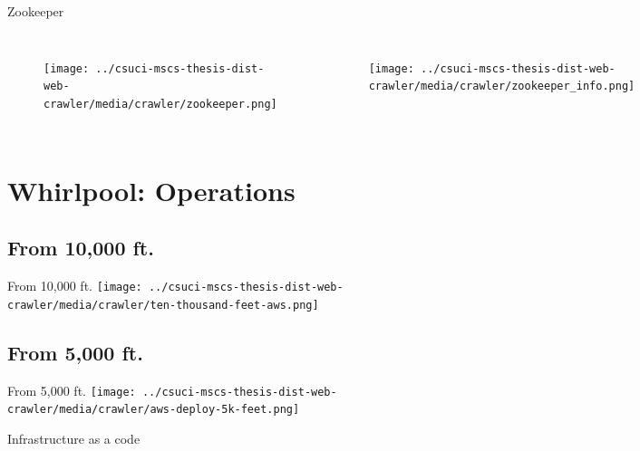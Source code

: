 \documentclass[9pt]{beamer}
\begin{document}

\begin{frame}{Zookeeper}
  \begin{columns}[t]
    \begin{figure}
     \centering \texttt{[image: ../csuci-mscs-thesis-dist-web-crawler/media/crawler/zookeeper.png]}
   \end{figure}
   \begin{figure}
     \centering
     \texttt{[image: ../csuci-mscs-thesis-dist-web-crawler/media/crawler/zookeeper\_info.png]}
   \end{figure}
 \end{columns}
\end{frame}


\section[opswork]{Whirlpool: Operations}
\begin{frame}[plain]
\end{frame}


\subsection{From 10,000 ft.}
\begin{frame}{From 10,000 ft.}
 \centering
 \texttt{[image: ../csuci-mscs-thesis-dist-web-crawler/media/crawler/ten-thousand-feet-aws.png]} 
\end{frame}


\subsection{From 5,000 ft.}
\begin{frame}{From 5,000 ft.}
  \centering
  \texttt{[image: ../csuci-mscs-thesis-dist-web-crawler/media/crawler/aws-deploy-5k-feet.png]}
\end{frame}


\begin{frame}{Infrastructure as a code}
  \centering
\end{frame}
\end{document}
